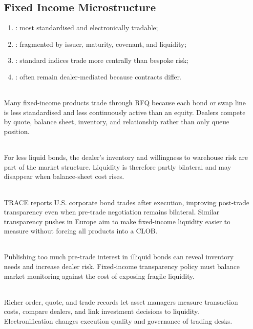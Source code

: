 \subsection{Fixed Income Microstructure}

\begin{taxonomy} 
\begin{enumerate}[label=\roman*.]
\setlength{\itemsep}{0pt}
\item {}: most standardised and electronically tradable;
\item {}: fragmented by issuer, maturity, covenant, and liquidity;
\item {}: standard indices trade more centrally than bespoke risk;
\item {}: often remain dealer-mediated because contracts differ.
\end{enumerate}
\end{taxonomy}

\begin{principle} \\
Many fixed-income products trade through RFQ because each bond or swap line is less standardised and less continuously active than an equity. Dealers compete by quote, balance sheet, inventory, and relationship rather than only queue position.
\end{principle}

\begin{mechanism} \\
For less liquid bonds, the dealer's inventory and willingness to warehouse risk are part of the market structure. Liquidity is therefore partly bilateral and may disappear when balance-sheet cost rises.
\end{mechanism}

\begin{marketrule} \\
TRACE reports U.S. corporate bond trades after execution, improving post-trade transparency even when pre-trade negotiation remains bilateral. Similar transparency pushes in Europe aim to make fixed-income liquidity easier to measure without forcing all products into a CLOB.
\end{marketrule}

\begin{caveat} \\
Publishing too much pre-trade interest in illiquid bonds can reveal inventory needs and increase dealer risk. Fixed-income transparency policy must balance market monitoring against the cost of exposing fragile liquidity.
\end{caveat}

\begin{practitionernote} \\
Richer order, quote, and trade records let asset managers measure transaction costs, compare dealers, and link investment decisions to liquidity. Electronification changes execution quality and governance of trading desks.
\end{practitionernote}

